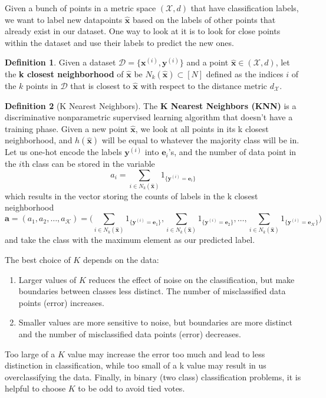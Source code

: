 \documentclass{article}
\theoremstyle{definition}
\newtheorem{definition}{Definition}[section]
\begin{document}
  Given a bunch of points in a metric space $(\mathcal{X}, d)$ that have classification labels, we want to label new datapoints $\hat{\mathbf{x}}$ based on the labels of other points that already exist in our dataset. One way to look at it is to look for close points within the dataset and use their labels to predict the new ones. 

  \begin{definition}
  Given a dataset $\mathcal{D} = \{\mathbf{x}^{(i)}, \mathbf{y}^{(i)}\}$ and a point $\hat{\mathbf{x}} \in (\mathcal{X}, d)$, let the \textbf{k closest neighborhood} of $\hat{\mathbf{x}}$ be $N_k (\hat{\mathbf{x}}) \subset [N]$ defined as the indices $i$ of the $k$ points in $\mathcal{D}$ that is closest to $\hat{\mathbf{x}}$ with respect to the distance metric $d_\mathcal{X}$. 
  \end{definition}

  \begin{definition}[K Nearest Neighbors]
  The \textbf{K Nearest Neighbors (KNN)} is a discriminative nonparametric supervised learning algorithm that doesn't have a training phase. Given a new point $\hat{\mathbf{x}}$, we look at all points in its k closest neighborhood, and $h(\hat{\mathbf{x}})$ will be equal to whatever the majority class will be in. Let us one-hot encode the labels $\mathbf{y}^{(i)}$ into $\mathbf{e}_i$'s, and the number of data point in the $i$th class can be stored in the variable 
  \[a_i = \sum_{i \in N_k (\hat{\mathbf{x}})} 1_{\{\mathbf{y}^{(i)} = \mathbf{e}_i\}}\]
  which results in the vector storing the counts of labels in the k closest neighborhood 
  \[\mathbf{a} = (a_1, a_2, \ldots, a_\mathcal{K}) = \bigg( \sum_{i \in N_k (\hat{\mathbf{x}})} 1_{\{\mathbf{y}^{(i)} = \mathbf{e}_1\}}, \sum_{i \in N_k (\hat{\mathbf{x}})} 1_{\{\mathbf{y}^{(i)} = \mathbf{e}_2\}}, \ldots, \sum_{i \in N_k (\hat{\mathbf{x}})} 1_{\{\mathbf{y}^{(i)} = \mathbf{e}_\mathcal{K}\}} \bigg)  \]
  and take the class with the maximum element as our predicted label. 
  \end{definition}

  The best choice of $K$ depends on the data: 
  \begin{enumerate}
      \item Larger values of $K$ reduces the effect of noise on the classification, but make boundaries between classes less distinct. The number of misclassified data points (error) increases. 
      \item Smaller values are more sensitive to noise, but boundaries are more distinct and the number of misclassified data points (error) decreases.
  \end{enumerate}
  Too large of a $K$ value may increase the error too much and lead to less distinction in classification, while too small of a k value may result in us overclassifying the data. Finally, in binary (two class) classification problems, it is helpful to choose $K$ to be odd to avoid tied votes.
\end{document}
